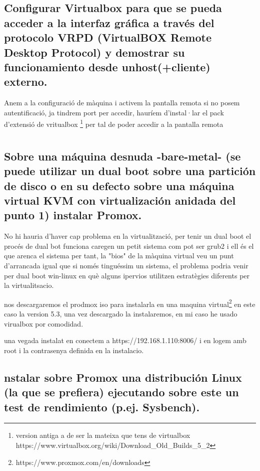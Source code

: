 \documentclass[preprint,11pt]{elsarticle}
\begin{document}
\subsection{Configurar Virtualbox para que se pueda acceder a la interfaz gráfica a través del protocolo VRPD (VirtualBOX Remote Desktop Protocol) y demostrar su funcionamiento desde unhost(+cliente) externo.}

Anem a la configuració de màquina i activem la pantalla remota si no posem autentificació, ja tindrem port per accedir, hauríem d'instal·lar el pack d'extensió de vritualbox \footnote{version antiga a de ser la mateixa que tens de virtualbox https://www.virtualbox.org/wiki/Download\_Old\_Builds\_5\_2} per tal de poder accedir a la pantalla remota

\section{}
\subsection{Sobre una máquina desnuda -bare-metal- (se puede utilizar un dual boot sobre una partición de disco o en su defecto sobre una máquina virtual KVM con virtualización anidada del punto 1) instalar Promox.}

No hi hauria d'haver cap problema en la virtualització, per tenir un dual boot el procés de dual bot funciona caregen un petit sistema com pot ser grub2 i ell és el que arenca el sistema per tant, la "bios" de la màquina virtual veu un punt d'arrancada igual que si només tinguéssim un sistema, el problema podria venir per dual boot win-linux en què alguns ipervios utilitzen estratègies diferents per la virtualitsacio.\smallskip

nos descargaremos el prodmox iso para instalarla en una maquina virtual\footnote{https://www.proxmox.com/en/downloads} en este caso la \newline version 5.3, una vez descargado la instalaremos, en mi caso he usado virualbox por comodidad.

una vegada instalat en conectem a https://192.168.1.110:8006/ i en logem amb root i la contrasenya definida en la instalacio. 

\clearpage

\subsection{nstalar sobre Promox una distribución Linux (la que se prefiera) ejecutando sobre este un test de rendimiento (p.ej. Sysbench).}
\end{document}
